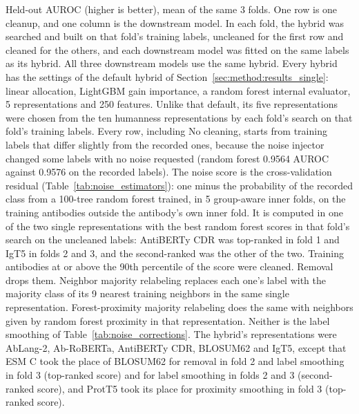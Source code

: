 \begin{table}[htbp]
\caption[Cleaning training labels before the hybrid is built on humanness]{Held-out AUROC (higher is better), mean of the same 3 folds. One row is one cleanup, and one column is the downstream model. In each fold, the hybrid was searched and built on that fold's training labels, uncleaned for the first row and cleaned for the others, and each downstream model was fitted on the same labels as its hybrid. All three downstream models use the same hybrid. Every hybrid has the settings of the default hybrid of Section~\ref{sec:method:results_single}: linear allocation, LightGBM gain importance, a random forest internal evaluator, 5 representations and 250 features. Unlike that default, its five representations were chosen from the ten humanness representations by each fold's search on that fold's training labels. Every row, including No cleaning, starts from training labels that differ slightly from the recorded ones, because the noise injector changed some labels with no noise requested (random forest 0.9564 AUROC against 0.9576 on the recorded labels). The noise score is the cross-validation residual (Table~\ref{tab:noise_estimators}): one minus the probability of the recorded class from a 100-tree random forest trained, in 5 group-aware inner folds, on the training antibodies outside the antibody's own inner fold. It is computed in one of the two single representations with the best random forest scores in that fold's search on the uncleaned labels: AntiBERTy CDR was top-ranked in fold 1 and IgT5 in folds 2 and 3, and the second-ranked was the other of the two. Training antibodies at or above the 90th percentile of the score were cleaned. Removal drops them. Neighbor majority relabeling replaces each one's label with the majority class of its 9 nearest training neighbors in the same single representation. Forest-proximity majority relabeling does the same with neighbors given by random forest proximity in that representation. Neither is the label smoothing of Table~\ref{tab:noise_corrections}. The hybrid's representations were AbLang-2, Ab-RoBERTa, AntiBERTy CDR, BLOSUM62 and IgT5, except that ESM C took the place of BLOSUM62 for removal in fold 2 and label smoothing in fold 3 (top-ranked score) and for label smoothing in folds 2 and 3 (second-ranked score), and ProtT5 took its place for proximity smoothing in fold 3 (top-ranked score).}
\label{tab:ch6prelim_humanness}
\end{table}


